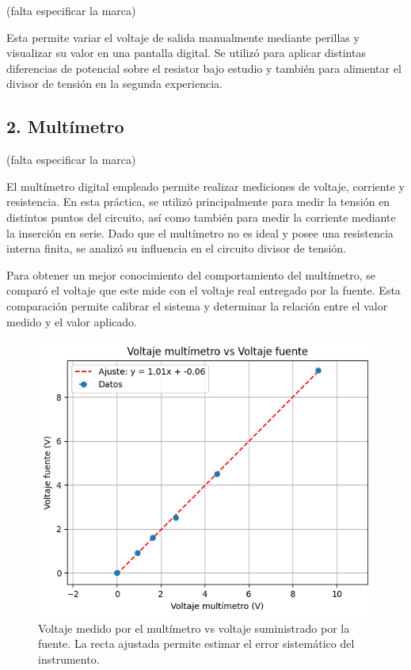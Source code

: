 \documentclass[11pt]{article}
\begin{document}
(falta especificar la marca)%

Esta permite variar el voltaje de salida manualmente mediante perillas y visualizar su valor en una pantalla digital. Se utilizó para aplicar distintas diferencias de potencial sobre el resistor bajo estudio y también para alimentar el divisor de tensión en la segunda experiencia.

\subsection*{2. Multímetro}

(falta especificar la marca)%

El multímetro digital empleado permite realizar mediciones de voltaje, corriente y resistencia. En esta práctica, se utilizó principalmente para medir la tensión en distintos puntos del circuito, así como también para medir la corriente mediante la inserción en serie. Dado que el multímetro no es ideal y posee una resistencia interna finita, se analizó su influencia en el circuito divisor de tensión.

Para obtener un mejor conocimiento del comportamiento del multímetro, se comparó el voltaje que este mide con el voltaje real entregado por la fuente. Esta comparación permite calibrar el sistema y determinar la relación entre el valor medido y el valor aplicado.

\begin{figure}[H]
    \centering
    \includegraphics[width=.9\linewidth]{VvsV.png}
    \caption{Voltaje medido por el multímetro vs voltaje suministrado por la fuente. La recta ajustada permite estimar el error sistemático del instrumento.}
    \label{fig:vvsf}
\end{figure}
\end{document}
